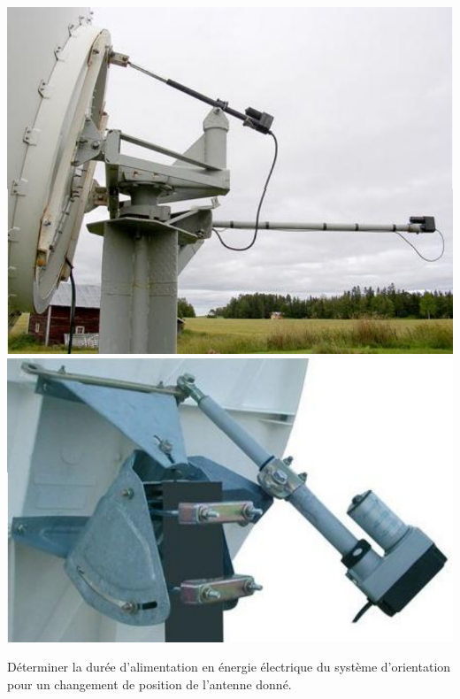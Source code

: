 \documentclass[10pt,fleqn]{article} %
\begin{document}
\begin{multicols}{2}
\begin{center}
\includegraphics[width=.45\linewidth]{images/fig4} 
\includegraphics[width=.45\linewidth]{images/fig5} 
\end{center}

\begin{obj}
Déterminer la durée d’alimentation en énergie électrique du système d’orientation pour un 
changement de position de l’antenne donné. 

\end{obj}




\end{multicols}
\end{document}
